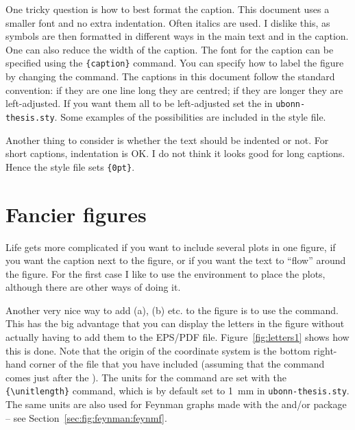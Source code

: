 One tricky question is how to best format the caption. This document
uses a smaller font and no extra indentation. Often italics are
used. I dislike this, as symbols are then formatted in different ways
in the main text and in the caption. One can also reduce the width of
the caption. The font for the caption can be specified using the
\texttt{\{caption\}} command. You can specify how
to label the figure by changing the  command. The
captions in this document follow the standard \KOMAScript{}
convention: if they are one line long they are centred; if they are
longer they are left-adjusted. If you want them all to be
left-adjusted set the  
in \texttt{ubonn-thesis.sty}. Some examples of the possibilities are
included in the style file.

Another thing to consider is whether the text should be indented or
not. For short captions, indentation is OK. I do not think it looks
good for long captions. Hence the style file sets
\texttt{\{0pt\}}.

\section{Fancier figures}
\label{sec:fig:fancy}

Life gets more complicated if you want to include several plots in
one figure, if you want the caption next to the figure, or if you want
the text to \enquote{flow} around the figure. For the first case I like to
use the  environment to place the plots, although
there are other ways of doing it.

Another very nice way to add (a), (b) etc. to the figure is to use the
 command. This has the big advantage that you can display
the letters in the figure without actually having to add them to the
EPS/PDF file. Figure~\ref{fig:letters1} shows how this is done. Note
that the origin of the coordinate system is the bottom right-hand
corner of the file that you have included (assuming that the
 command comes just after the ).
The units for the  command are set with the
\texttt{\{\textbackslash unitlength\}} command, which
is by default set to \SI{1}{\mm} in \texttt{ubonn-thesis.sty}. The
same units are also used for Feynman graphs made with the
 and/or  package -- see
Section~\ref{sec:fig:feynman:feynmf}.

